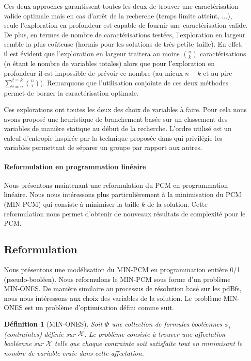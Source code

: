 \documentclass[a4paper,10pt]{article}
\newtheorem{definition}{Définition}
\begin{document}
Ces deux approches garantissent toutes les deux de trouver une caractérisation valide optimale mais en cas d'arrêt de la recherche (temps limite atteint, ...), seule l'exploration en profondeur est capable de fournir une caractérisation valide. De plus, en termes de nombre de caractérisations testées, l'exploration en largeur semble la plus coûteuse (hormis pour les solutions de très petite taille). En effet, il est évident que l'exploration en largeur traitera au moins $\binom{n}{k}$ caractérisations ($n$ étant le nombre de variables totales) alors que pour l'exploration en profondeur il est impossible de prévoir ce nombre (au mieux $n-k$ et au pire $\sum_{i=n}^{i=k}\binom{n}{i}$). Remarquons que l'utilisation conjointe de ces deux méthodes permet de borner la caractérisation optimale.

Ces explorations ont toutes les deux des choix de variables à faire. Pour cela nous avons proposé une heuristique de branchement basée sur un classement des variables de manière statique au début de la recherche. L'ordre utilisé est un calcul d'entropie inspirée par la technique proposée dans \cite{DesVer81} qui privilégie les variables permettant de séparer un groupe par rapport aux autres.

\paragraph{Reformulation en programmation linéaire}

Nous présentons maintenant une reformulation du PCM en programmation linéaire. Nous nous intéressons plus
particulièrement à la minimisation du PCM (MIN-PCM) qui consiste à minimiser la taille  $k$ de la solution. Cette reformulation nous permet d'obtenir de nouveaux résultats de complexité pour le PCM.

\subsection{Reformulation}
Nous présentons une modélisation du
MIN-PCM en programmation entière 0/1 (pseudo-booléen). Nous reformulons le MIN-PCM sous forme d'un problème MIN-ONES. De manière similaire au processus de résolution basé sur les pdBfs, nous nous intéressons aux choix des variables de la solution. Le problème MIN-ONES est un problème d'optimisation défini comme suit.

\begin{definition}[MIN-ONES]
Soit $ \Phi $ une collection de formules booléennes $\phi_i$ (contraintes)
définie sur  $\cal X$. Le problème consiste à trouver une affectation booléenne  sur $\cal X$ telle que
chaque contrainte soit satisfaite tout en minimisant le nombre de variable vraie dans cette affectation.
\end{definition}
\end{document}
